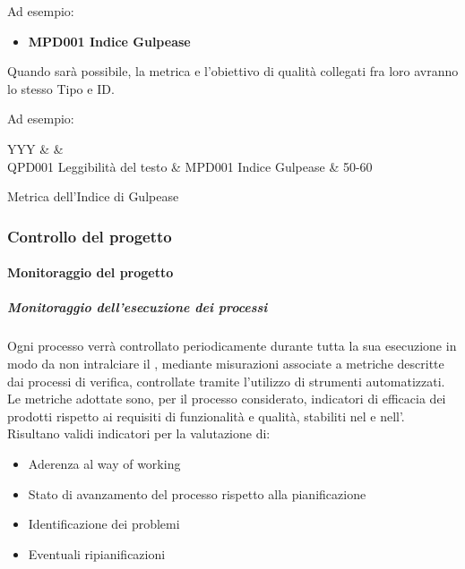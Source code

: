 			Ad esempio:

			\begin{itemize}
				\item \textbf{MPD001 Indice Gulpease}
			\end{itemize}

			Quando sarà possibile, la metrica e l'obiettivo di qualità collegati fra loro avranno lo stesso Tipo e ID.

			Ad esempio:

			\begin{table}[H]
				\begin{detailtable}{\textwidth}{YYY}
					 &
					 &
					\\\toprule
					QPD001 Leggibilità del testo & MPD001 Indice Gulpease & 50-60\\
				\end{detailtable}
				\caption[Metrica Indice di Gulpease]{Metrica dell'Indice di Gulpease}%
			\end{table}

		\subsubsection{Controllo del progetto}

			\paragraph{Monitoraggio del progetto}

			\subparagraph{Monitoraggio dell'esecuzione dei processi}
			Ogni processo verrà controllato periodicamente durante tutta la sua esecuzione in modo da non intralciare il ,
			mediante misurazioni associate a metriche descritte dai processi di verifica, controllate tramite l'utilizzo di strumenti automatizzati.
			Le metriche adottate sono, per il processo considerato, indicatori di efficacia dei prodotti rispetto ai requisiti di funzionalità e qualità,
			stabiliti nel \Doc{\PdQv} e nell'\Doc{\AdRv}.\\
			Risultano validi indicatori per la valutazione di:
			\begin{itemize}
				\item Aderenza al way of working
				\item Stato di avanzamento del processo rispetto alla pianificazione
				\item Identificazione dei problemi
				\item Eventuali ripianificazioni
			\end{itemize}

